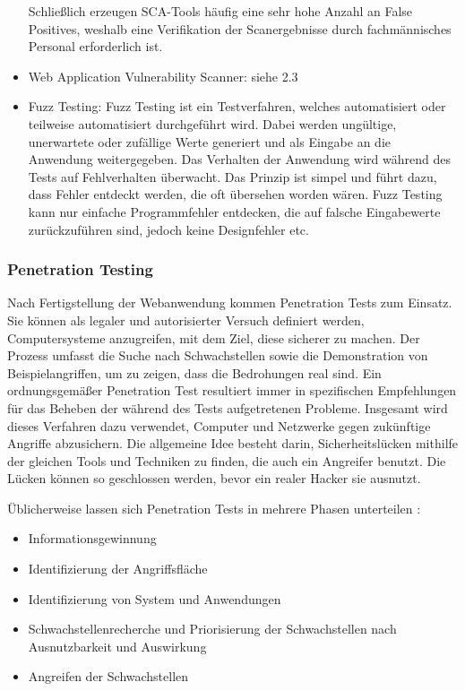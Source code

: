 \documentclass[12pt,oneside,a4paper,parskip,pointlessnumbers]{scrbook}
\begin{document}
\begin{itemize}
    Schließlich erzeugen SCA-Tools häufig eine sehr hohe Anzahl an False Positives, weshalb eine
    Verifikation der Scanergebnisse durch fachmännisches Personal erforderlich ist.
    \item Web Application Vulnerability Scanner: siehe 2.3
    \item Fuzz Testing:
    Fuzz Testing ist ein Testverfahren, welches automatisiert oder teilweise automatisiert durchgeführt
    wird. Dabei werden ungültige, unerwartete oder zufällige Werte generiert und als Eingabe an die
    Anwendung weitergegeben. Das Verhalten der Anwendung wird während des Tests auf
    Fehlverhalten überwacht. Das Prinzip ist simpel und führt dazu, dass Fehler entdeckt werden, die
    oft übersehen worden wären. Fuzz Testing kann nur einfache Programmfehler entdecken, die auf
    falsche Eingabewerte zurückzuführen sind, jedoch keine Designfehler etc. \cite{BSI}
  \end{itemize}

    \subsubsection{Penetration Testing}
    Nach Fertigstellung der Webanwendung kommen Penetration Tests zum Einsatz. Sie können als legaler und autorisierter Versuch definiert werden, Computersysteme anzugreifen, mit dem Ziel, diese sicherer zu machen.
    Der Prozess umfasst die Suche nach Schwachstellen sowie die Demonstration von Beispielangriffen, um zu zeigen, dass die Bedrohungen real sind.
    Ein ordnungsgemäßer Penetration Test resultiert immer in spezifischen Empfehlungen für das
    Beheben der während des Tests aufgetretenen Probleme.
    Insgesamt wird dieses Verfahren dazu verwendet, Computer und Netzwerke gegen zukünftige Angriffe abzusichern. Die allgemeine Idee besteht darin, Sicherheitslücken mithilfe der gleichen Tools und Techniken zu finden, die auch ein Angreifer benutzt. Die Lücken können so geschlossen werden, bevor ein realer Hacker sie ausnutzt. \cite{engebretson}

    Üblicherweise lassen sich Penetration Tests in mehrere Phasen unterteilen \cite{BSI}:

    \begin{itemize}
      \item Informationsgewinnung
      \item Identifizierung der Angriffsfläche
      \item Identifizierung von System und Anwendungen
      \item Schwachstellenrecherche und Priorisierung der Schwachstellen nach Ausnutzbarkeit und Auswirkung
      \item Angreifen der Schwachstellen
    \end{itemize}
\end{document}
